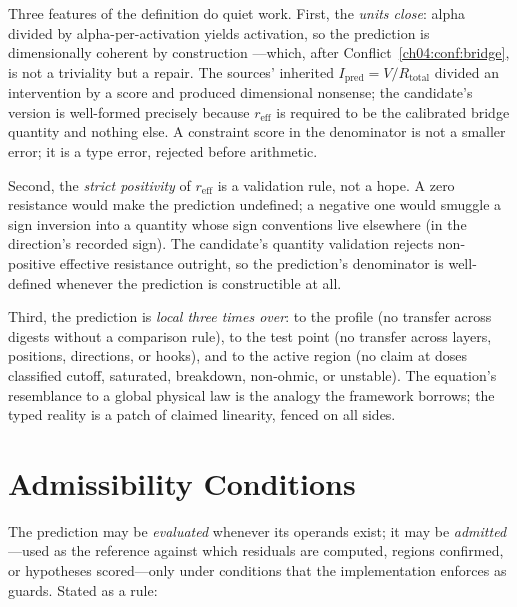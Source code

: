 Three features of the definition do quiet work. First, the \emph{units
close}: alpha divided by alpha-per-activation yields activation, so the
prediction is dimensionally coherent by construction
\cite{buckingham}---which, after Conflict~\ref{ch04:conf:bridge}, is not a
triviality but a repair. The sources' inherited
$I_{\mathrm{pred}} = V/R_{\mathrm{total}}$ divided an intervention by a
score and produced dimensional nonsense; the candidate's version is
well-formed precisely because $r_{\mathrm{eff}}$ is required to be the
calibrated bridge quantity and nothing else. A constraint score in the
denominator is not a smaller error; it is a type error, rejected before
arithmetic.

Second, the \emph{strict positivity} of $r_{\mathrm{eff}}$ is a validation
rule, not a hope. A zero resistance would make the prediction undefined; a
negative one would smuggle a sign inversion into a quantity whose sign
conventions live elsewhere (in the direction's recorded sign). The
candidate's quantity validation rejects non-positive effective resistance
outright, so the prediction's denominator is well-defined whenever the
prediction is constructible at all.

Third, the prediction is \emph{local three times over}: to the profile (no
transfer across digests without a comparison rule), to the test point (no
transfer across layers, positions, directions, or hooks), and to the active
region (no claim at doses classified cutoff, saturated, breakdown,
non-ohmic, or unstable). The equation's resemblance to a global physical
law is the analogy the framework borrows; the typed reality is a patch of
claimed linearity, fenced on all sides.

\section{Admissibility Conditions}\label{ch06:admissibility}

The prediction may be \emph{evaluated} whenever its operands exist; it may
be \emph{admitted}---used as the reference against which residuals are
computed, regions confirmed, or hypotheses scored---only under conditions
that the implementation enforces as guards. Stated as a rule:

